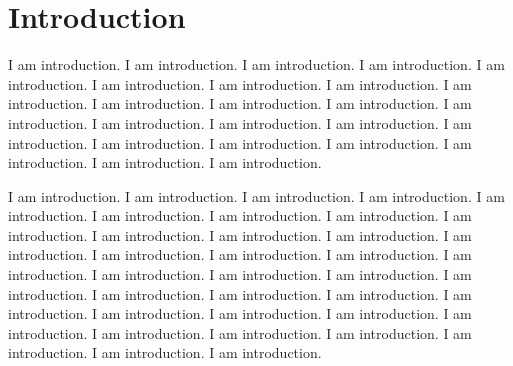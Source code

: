 \chapter{Introduction}

I am introduction. I am introduction. I am introduction. I am introduction. I am introduction. I am introduction. I am introduction. I am introduction. I am introduction. I am introduction. I am introduction. I am introduction. I am introduction. I am introduction. I am introduction. I am introduction. I am introduction. I am introduction. I am introduction. I am introduction. I am introduction. I am introduction. I am introduction. 

I am introduction. I am introduction. I am introduction. I am introduction. I am introduction. I am introduction. I am introduction. I am introduction. I am introduction. I am introduction. I am introduction. I am introduction. I am introduction. I am introduction. I am introduction. I am introduction. I am introduction. I am introduction. I am introduction. I am introduction. I am introduction. I am introduction. I am introduction. I am introduction. I am introduction. I am introduction. I am introduction. I am introduction. I am introduction. I am introduction. I am introduction. I am introduction. I am introduction. I am introduction. I am introduction. 